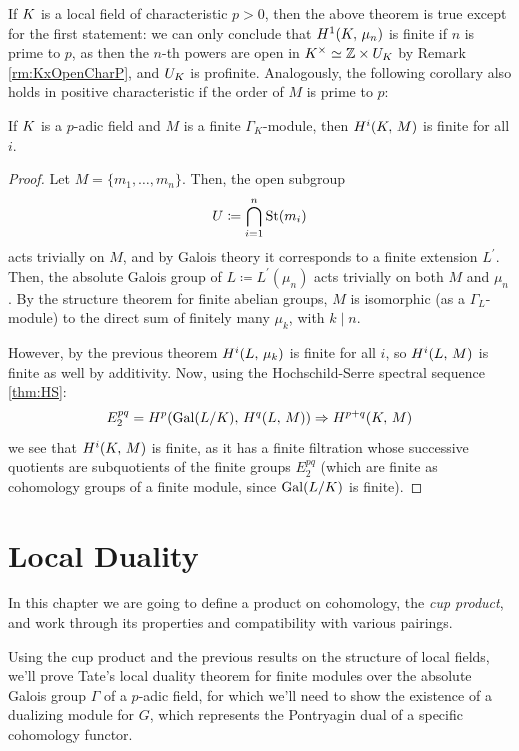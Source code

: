 \documentclass[a4paper, oneside]{memoir}
\begin{document}
\begin{remark}\label{rm:H1CharP}
    If $K$ is a local field of characteristic $p>0$, then the above theorem is true except for the first statement: we can only conclude that $H^{1}( K, \, \mu_n )$ is finite if $n$ is prime to $p$, as then the $n$-th powers are open in $K^\times\simeq\mathbb{Z}\times U_K$ by Remark \ref{rm:KxOpenCharP}, and $U_K$ is profinite. Analogously, the following corollary also holds in positive characteristic if the order of $M$ is prime to $p$:
\end{remark}

\begin{corollary}\label{cor:FinCohom}
    If $K$ is a $p$-adic field and $M$ is a finite $\Gamma_K$-module, then
    \(H^{i}( K, \, M )\) is finite for all $i$.
\end{corollary}
\begin{proof}
    Let $M=\{m_1,\ldots,m_n\}$. Then, the open subgroup
    \[
        U\coloneqq \bigcap_{i=1}^n{\operatorname{\mathrm{St}}(m_i)}
    \]
    acts trivially on $M$, and by Galois theory it corresponds to a finite extension $L^{\prime} $. Then, the absolute Galois group of $L\coloneqq L^{\prime}(\mu_n)$ acts trivially on both $M$ and $\mu_n$. By the structure theorem for finite abelian groups, $M$ is isomorphic (as a $\Gamma_L$-module) to the direct sum of finitely many $\mu_k$, with $k\mid n$.

    However, by the previous theorem $H^{i}( L, \, \mu_k )$ is finite for all $i$, so $H^{i}( L, \, M )$ is finite as well by additivity. Now, using the Hochschild-Serre spectral sequence \eqref{thm:HS}:
    \[
        E_2^{pq}= H^{p}( \mathrm{Gal}{(L / K)}, \, H^{q}( L, \, M ) ) \Rightarrow H^{p+q}( K, \, M )
    \]
    we see that $H^{i}( K, \, M )$ is finite, as it has a finite filtration whose successive quotients are subquotients of the finite groups $E_2^{pq}$ (which are finite as cohomology groups of a finite module, since $\mathrm{Gal}(L /K)$ is finite).
\end{proof}




\chapter{Local Duality}
In this chapter we are going to define a product on cohomology, the \textit{cup product}, and work through its properties and compatibility with various pairings.

Using the cup product and the previous results on the structure of local fields, we'll prove Tate's local duality theorem for finite modules over the absolute Galois group $\Gamma$ of a $p$-adic field, for which we'll need to show the existence of a dualizing module for $G$, which represents the Pontryagin dual of a specific cohomology functor.
\end{document}
